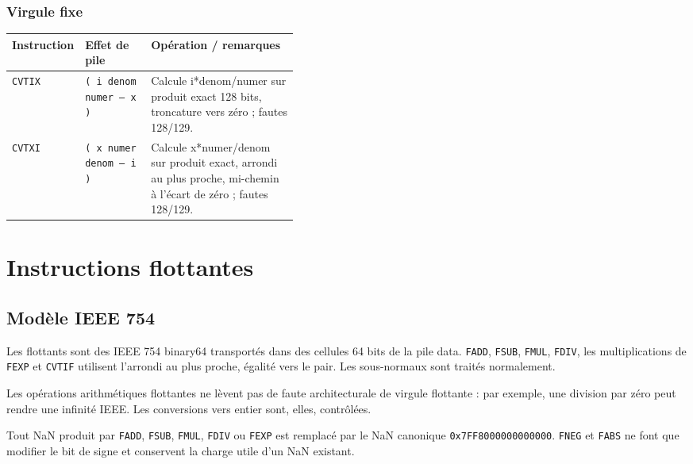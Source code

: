 \documentclass[10pt,a4paper,twoside,openany]{book}
\renewcommand{\arraystretch}{1.12}
\begin{document}
\subsection{Virgule fixe}
\begin{center}
\renewcommand{\arraystretch}{1.16}
\begin{tabularx}{\linewidth}{@{}p{0.19\linewidth} p{0.23\linewidth} X@{}}
\toprule \textbf{Instruction} & \textbf{Effet de pile} & \textbf{Opération / remarques}\\ \midrule
\texttt{CVTIX} & \texttt{( i denom numer -- x )} & Calcule i*denom/numer sur produit exact 128 bits, troncature vers zéro ; fautes 128/129.\\
\texttt{CVTXI} & \texttt{( x numer denom -- i )} & Calcule x*numer/denom sur produit exact, arrondi au plus proche, mi-chemin à l'écart de zéro ; fautes 128/129.\\
\bottomrule
\end{tabularx}
\end{center}
\chapter{Instructions flottantes}
\section{Modèle IEEE 754}
Les flottants sont des IEEE 754 binary64 transportés dans des cellules 64 bits de la pile data. \texttt{FADD}, \texttt{FSUB}, \texttt{FMUL}, \texttt{FDIV}, les multiplications de \texttt{FEXP} et \texttt{CVTIF} utilisent l'arrondi au plus proche, égalité vers le pair. Les sous-normaux sont traités normalement.

Les opérations arithmétiques flottantes ne lèvent pas de faute architecturale de virgule flottante : par exemple, une division par zéro peut rendre une infinité IEEE. Les conversions vers entier sont, elles, contrôlées.

Tout NaN produit par \texttt{FADD}, \texttt{FSUB}, \texttt{FMUL}, \texttt{FDIV} ou \texttt{FEXP} est remplacé par le NaN canonique \texttt{0x7FF8000000000000}. \texttt{FNEG} et \texttt{FABS} ne font que modifier le bit de signe et conservent la charge utile d'un NaN existant.
\end{document}
